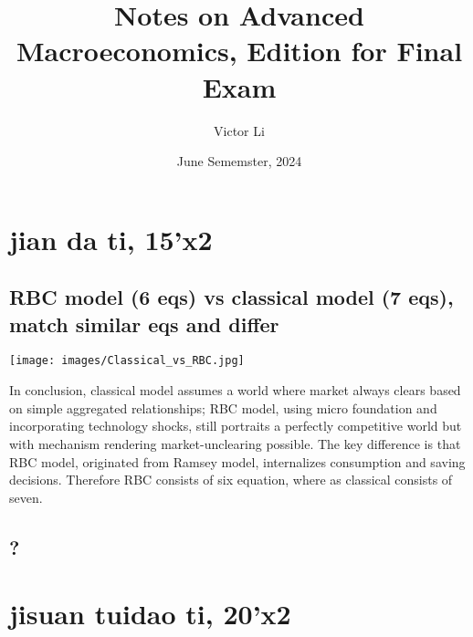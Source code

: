 \documentclass{article}
\title{Notes on Advanced Macroeconomics, Edition for Final Exam}
\author{Victor Li}
\date{June Sememster, 2024}
\begin{document}
\maketitle




















\section{jian da ti, 15'x2}

\subsection{RBC model (6 eqs) vs classical model (7 eqs), match similar eqs and differ}

\texttt{[image: images/Classical\_vs\_RBC.jpg]}

In conclusion, classical model assumes a world where market always clears based on simple aggregated relationships; RBC model, using micro foundation and incorporating technology shocks, still portraits a perfectly competitive world but with mechanism rendering market-unclearing possible. The key difference is that RBC model, originated from Ramsey model, internalizes consumption and saving decisions. Therefore RBC consists of six equation, where as classical consists of seven.














\subsection{?}














\newpage
\section{jisuan tuidao ti, 20'x2}
\end{document}
